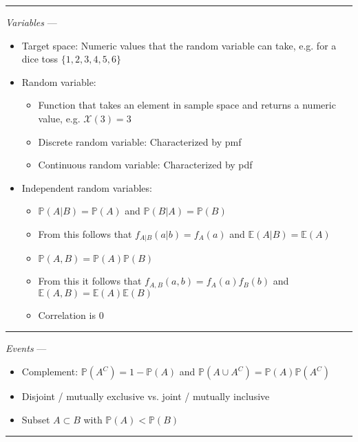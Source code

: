 {\color{lightgray}\hrule height 0.001mm}

\emph{Variables} --- 
\begin{itemize}
    \item Target space: Numeric values that the random variable can take, e.g. for a dice toss $\{ 1,2,3,4,5,6\}$
    \item Random variable:
    \begin{itemize}
        \item Function that takes an element in sample space and returns a numeric value, e.g. $\mathcal{X}(3) = 3$
        \item Discrete random variable: Characterized by pmf
        \item Continuous random variable: Characterized by pdf
    \end{itemize}
    \item Independent random variables:
    \begin{itemize}
        \item $\mathbb{P}(A|B) = \mathbb{P}(A)$ and $\mathbb{P}(B|A) = \mathbb{P}(B)$
        \item From this follows that $f_{A|B}(a|b) = f_A(a)$ and $\mathbb{E}(A|B) = \mathbb{E}(A)$ 
        \item $\mathbb{P}(A, B) = \mathbb{P}(A)\mathbb{P}(B)$
        \item From this it follows that $f_{A,B}(a,b) = f_A(a) f_B(b)$ and $\mathbb{E}(A,B) = \mathbb{E}(A)\mathbb{E}(B)$
        \item Correlation is 0 
    \end{itemize}
\end{itemize}

{\color{lightgray}\hrule height 0.001mm}

\emph{Events} --- 
\begin{itemize}
    \item Complement: $\mathbb{P}(A^C) = 1 - \mathbb{P}(A)$ and $\mathbb{P}(A \cup A^C) = \mathbb{P}(A)\mathbb{P}(A^C)$
    \item Disjoint / mutually exclusive vs. joint / mutually inclusive
    \item Subset $A \subset B$ with $\mathbb{P}(A) < \mathbb{P}(B)$
\end{itemize}

{\color{lightgray}\hrule height 0.001mm}

